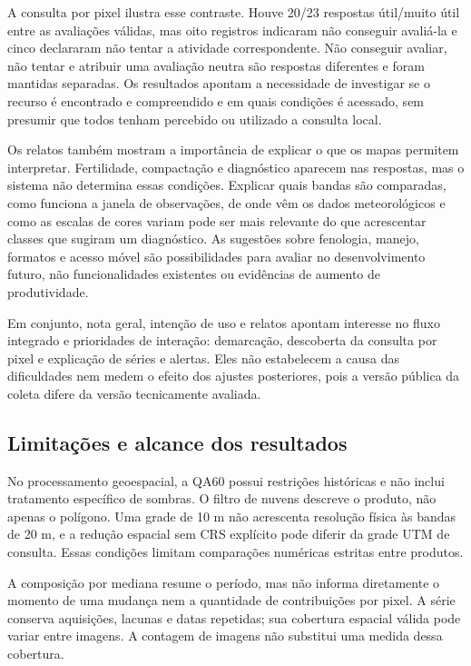 A consulta por pixel ilustra esse contraste. Houve 20/23 respostas útil/muito útil entre as avaliações válidas, mas oito registros indicaram não conseguir avaliá-la e cinco declararam não tentar a atividade correspondente. Não conseguir avaliar, não tentar e atribuir uma avaliação neutra são respostas diferentes e foram mantidas separadas. Os resultados apontam a necessidade de investigar se o recurso é encontrado e compreendido e em quais condições é acessado, sem presumir que todos tenham percebido ou utilizado a consulta local.

Os relatos também mostram a importância de explicar o que os mapas permitem interpretar. Fertilidade, compactação e diagnóstico aparecem nas respostas, mas o sistema não determina essas condições. Explicar quais bandas são comparadas, como funciona a janela de observações, de onde vêm os dados meteorológicos e como as escalas de cores variam pode ser mais relevante do que acrescentar classes que sugiram um diagnóstico. As sugestões sobre fenologia, manejo, formatos e acesso móvel são possibilidades para avaliar no desenvolvimento futuro, não funcionalidades existentes ou evidências de aumento de produtividade.

Em conjunto, nota geral, intenção de uso e relatos apontam interesse no fluxo integrado e prioridades de interação: demarcação, descoberta da consulta por pixel e explicação de séries e alertas. Eles não estabelecem a causa das dificuldades nem medem o efeito dos ajustes posteriores, pois a versão pública da coleta difere da versão tecnicamente avaliada.

\subsection{Limitações e alcance dos resultados}

No processamento geoespacial, a QA60 possui restrições históricas e não inclui tratamento específico de sombras. O filtro de nuvens descreve o produto, não apenas o polígono. Uma grade de 10 m não acrescenta resolução física às bandas de 20 m, e a redução espacial sem CRS explícito pode diferir da grade UTM de consulta. Essas condições limitam comparações numéricas estritas entre produtos.

A composição por mediana resume o período, mas não informa diretamente o momento de uma mudança nem a quantidade de contribuições por pixel. A série conserva aquisições, lacunas e datas repetidas; sua cobertura espacial válida pode variar entre imagens. A contagem de imagens não substitui uma medida dessa cobertura.

